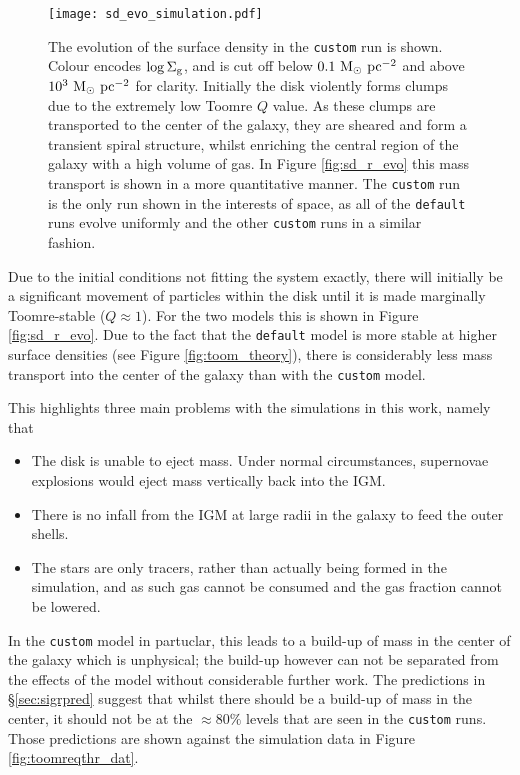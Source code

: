\begin{figure}[!ht]
    \texttt{[image: sd\_evo\_simulation.pdf]}
    \caption{The evolution of the surface density in the {\tt custom} run is shown. Colour encodes $\log\Sigma_\mathrm{g}$, and is cut off below $0.1 ~\mathrm{M}_{\odot} ~\mathrm{pc}^{-2}$ and above $10^3 ~\mathrm{M}_{\odot} ~\mathrm{pc}^{-2}$ for clarity. Initially the disk violently forms clumps due to the extremely low Toomre $Q$ value. As these clumps are transported to the center of the galaxy, they are sheared and form a transient spiral structure, whilst enriching the central region of the galaxy with a high volume of gas. In Figure \ref{fig:sd_r_evo} this mass transport is shown in a more quantitative manner. The {\tt custom} run is the only run shown in the interests of space, as all of the {\tt default} runs evolve uniformly and the other {\tt custom} runs in a similar fashion.}
    \label{fig:sd_evo_small}
\end{figure}
Due to the initial conditions not fitting the system exactly, there will initially be a significant movement of particles within the disk until it is made marginally Toomre-stable ($Q\approx1$).
For the two models this is shown in Figure \ref{fig:sd_r_evo}.
Due to the fact that the {\tt default} model is more stable at higher surface densities (see Figure \ref{fig:toom_theory}), there is considerably less mass transport into the center of the galaxy than with the {\tt custom} model.

This highlights three main problems with the simulations in this work, namely that
\begin{itemize}
    \item The disk is unable to eject mass. Under normal circumstances, supernovae explosions would eject mass vertically back into the IGM.
    \item There is no infall from the IGM at large radii in the galaxy to feed the outer shells.
    \item The stars are only tracers, rather than actually being formed in the simulation, and as such gas cannot be consumed and the gas fraction cannot be lowered.
\end{itemize}
In the {\tt custom} model in partuclar, this leads to a build-up of mass in the center of the galaxy which is unphysical; the build-up however can not be separated from the effects of the model without considerable further work.
The predictions in \S \ref{sec:sigrpred} suggest that whilst there should be a build-up of mass in the center, it should not be at the $\approx 80\%$ levels that are seen in the {\tt custom} runs.
Those predictions are shown against the simulation data in Figure \ref{fig:toomreqthr_dat}.

